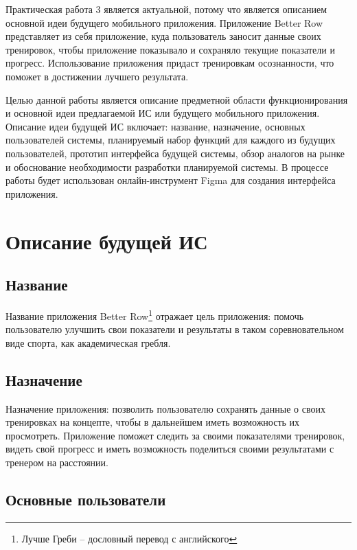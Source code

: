 \documentclass[14pt]{extreport}
\begin{document}
\pagestyle{empty}

\pagestyle{plain}

\tableofcontents

\intro

Практическая работа 3 является актуальной, потому что является описанием основной идеи будущего мобильного приложения. Приложение Better Row представляет из себя приложение, куда пользователь заносит данные своих тренировок, чтобы приложение показывало и сохраняло текущие показатели и прогресс. Использование приложения придаст тренировкам осознанности, что поможет в достижении лучшего результата.

Целью данной работы является описание предметной области функционирования и основной идеи предлагаемой ИС или будущего мобильного приложения. Описание идеи будущей ИС включает: название, назначение, основных пользователей системы, планируемый набор функций для каждого из будущих пользователей, прототип интерфейса будущей системы, обзор аналогов на рынке и обоснование необходимости разработки планируемой системы. В процессе работы будет использован онлайн-инструмент Figma для создания интерфейса приложения.

\chapter{Описание будущей ИС}

\section{Название}

Название приложения {Better Row}\footnote{Лучше Греби – дословный перевод с английского} отражает цель приложения: помочь пользователю улучшить свои показатели и результаты в таком соревновательном виде спорта, как академическая гребля.

\section{Назначение}

Назначение приложения: позволить пользователю сохранять данные о своих тренировках на концепте, чтобы в дальнейшем иметь возможность их просмотреть. Приложение поможет следить за своими показателями тренировок, видеть свой прогресс и иметь возможность поделиться своими результатами с тренером на расстоянии.

\section{Основные пользователи}
\end{document}
